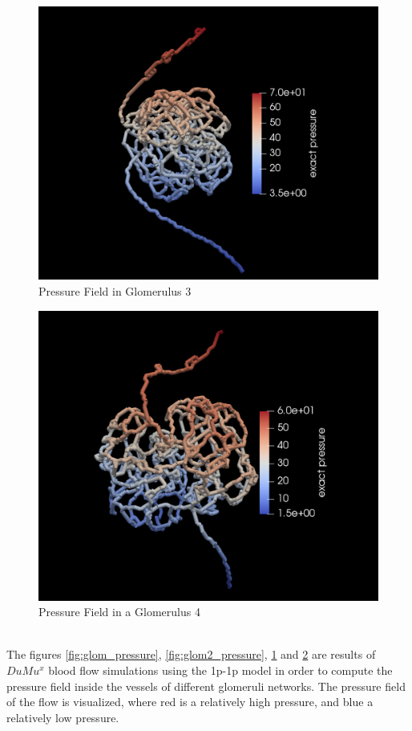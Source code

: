 \begin{figure}[h]
\centering
\includegraphics[width=162mm]{glom3_pressure}
\caption{Pressure Field in Glomerulus 3}
\label{fig:glom3_pressure}
\end{figure}
\begin{figure}[h]
\centering
\includegraphics[width=162mm]{glom4_pressure}
\caption{Pressure Field in a Glomerulus 4}
\label{fig:glom4_pressure}
\end{figure}\\
The figures \ref{fig:glom_pressure},  \ref{fig:glom2_pressure},  \ref{fig:glom3_pressure} and  \ref{fig:glom4_pressure} are results of $DuMu^x$ blood flow simulations using the 1p-1p model in order to compute the pressure field inside the vessels of different glomeruli networks. The pressure field of the flow is visualized, where red is a relatively high pressure, and blue a relatively low pressure.\\

